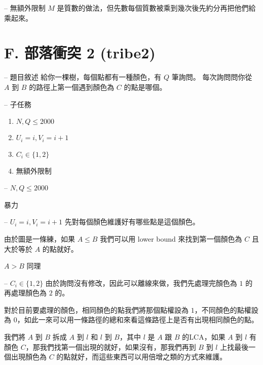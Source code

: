 \documentclass[hyperref,UTF8,notheorems,xcolor={dvipsnames}]{beamer}
\newcommand{\btitle}[1]{{\secname} -- #1}
\theoremstyle{definition}
\begin{document}
\begin{frame}[fragile]{\btitle{無額外限制}}
	$M$ 是質數的做法，但先數每個質數被乘到幾次後先約分再把他們給乘起來。
\end{frame}


\section{F. 部落衝突 2 (tribe2)}

\begin{frame}[fragile]{\btitle{題目敘述}}
	給你一棵樹，每個點都有一種顏色，有 $Q$ 筆詢問。
	每次詢問問你從 $A$ 到 $B$ 的路徑上第一個遇到顏色為 $C$ 的點是哪個。
\end{frame}

\begin{frame}[fragile]{\btitle{子任務}}
	\begin{enumerate}
		\item $N, Q \le 2000$
		\item $U_i = i, V_i = i + 1$
		\item $C_i \in \{1, 2\}$
		\item 無額外限制
	\end{enumerate}
\end{frame}

\begin{frame}[fragile]{\btitle{$N, Q \le 2000$}}

	暴力

\end{frame}

\begin{frame}[fragile]{\btitle{$U_i = i, V_i = i + 1$}}
	先對每個顏色維護好有哪些點是這個顏色。
	\pause
	
	由於圖是一條練，如果 $A \le B$ 我們可以用 lower bound 來找到第一個顏色為 $C$ 且大於等於 $A$ 的點就好。 

	$A > B$ 同理

\end{frame}

\begin{frame}[fragile]{\btitle{$C_i \in \{1, 2\}$}}
	由於詢問沒有修改，因此可以離線來做，我們先處理完顏色為 $1$ 的再處理顏色為 $2$ 的。
	\pause

	對於目前要處理的顏色，相同顏色的點我們將那個點權設為 $1$，不同顏色的點權設為 $0$，如此一來可以用一條路徑的總和來看這條路徑上是否有出現相同顏色的點。
	\pause

	我們將 $A$ 到 $B$ 拆成 $A$ 到 $l$ 和 $l$ 到 $B$，其中 $l$ 是 $A$ 跟 $B$ 的LCA，如果 $A$ 到 $l$ 有顏色 $C$，那我們找第一個出現的就好，如果沒有，那我們再到 $B$ 到 $l$ 上找最後一個出現顏色為 $C$ 的點就好，而這些東西可以用倍增之類的方式來維護。
\end{frame}
\end{document}
